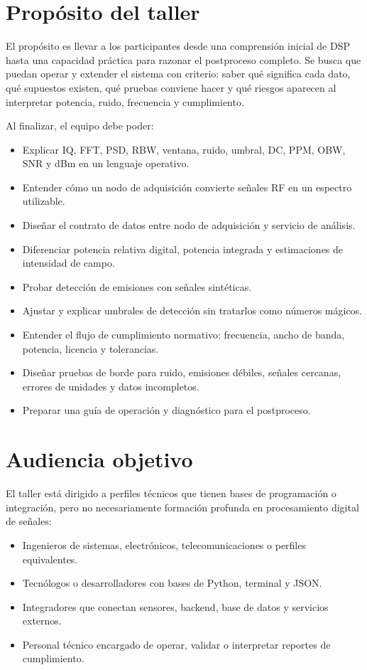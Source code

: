 \documentclass[11pt,a4paper]{article}
\begin{document}
\section*{Propósito del taller}

El propósito es llevar a los participantes desde una comprensión inicial de DSP hasta una capacidad práctica para razonar el postproceso completo. Se busca que puedan operar y extender el sistema con criterio: saber qué significa cada dato, qué supuestos existen, qué pruebas conviene hacer y qué riesgos aparecen al interpretar potencia, ruido, frecuencia y cumplimiento.

Al finalizar, el equipo debe poder:

\begin{itemize}
  \item Explicar IQ, FFT, PSD, RBW, ventana, ruido, umbral, DC, PPM, OBW, SNR y dBm en un lenguaje operativo.
  \item Entender cómo un nodo de adquisición convierte señales RF en un espectro utilizable.
  \item Diseñar el contrato de datos entre nodo de adquisición y servicio de análisis.
  \item Diferenciar potencia relativa digital, potencia integrada y estimaciones de intensidad de campo.
  \item Probar detección de emisiones con señales sintéticas.
  \item Ajustar y explicar umbrales de detección sin tratarlos como números mágicos.
  \item Entender el flujo de cumplimiento normativo: frecuencia, ancho de banda, potencia, licencia y tolerancias.
  \item Diseñar pruebas de borde para ruido, emisiones débiles, señales cercanas, errores de unidades y datos incompletos.
  \item Preparar una guía de operación y diagnóstico para el postproceso.
\end{itemize}

\section*{Audiencia objetivo}

El taller está dirigido a perfiles técnicos que tienen bases de programación o integración, pero no necesariamente formación profunda en procesamiento digital de señales:

\begin{itemize}
  \item Ingenieros de sistemas, electrónicos, telecomunicaciones o perfiles equivalentes.
  \item Tecnólogos o desarrolladores con bases de Python, terminal y JSON.
  \item Integradores que conectan sensores, backend, base de datos y servicios externos.
  \item Personal técnico encargado de operar, validar o interpretar reportes de cumplimiento.
\end{itemize}
\end{document}
